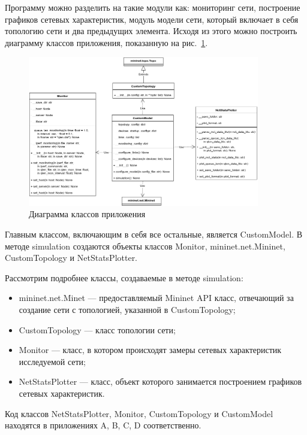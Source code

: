Программу можно разделить на такие модули как: мониторинг сети,
построение графиков сетевых характеристик, модуль модели сети, который
включает в себя топологию сети и два предыдущих элемента. Исходя из
этого можно построить диаграмму классов приложения, показанную на
рис.~\ref{fig:30002}.

\begin{figure}[!h]
\centering
\includegraphics[width=0.9\textwidth]{image/class_dia.png}
\caption{Диаграмма классов приложения}
\label{fig:30002}
\end{figure}

Главным классом, включающим в себя все остальные, является
CustomModel.  В методе simulation создаются объекты классов Monitor,
mininet.net.Mininet, CustomTopology и NetStatsPlotter.

Рассмотрим подробнее классы, создаваемые в методе simulation:
\begin{itemize}
\item mininet.net.Minet --- предоставляемый Mininet API класс,
  отвечающий за создание сети с топологией, указанной в
  CustomTopology;
\item CustomTopology --- класс топологии сети;
\item Monitor --- класс, в котором происходят замеры сетевых
  характеристик исследуемой сети;
\item NetStatsPlotter --- класс, объект которого занимается
  построением графиков сетевых характеристик.
\end{itemize}

Код классов NetStatsPlotter, Monitor, CustomTopology и CustomModel
находятся в приложениях A, B, C, D
соответственно.

